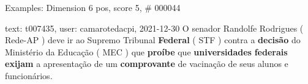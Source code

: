 \begin{frame}{Examples: Dimension 6 pos, score 5, \# 000044}
\footnotesize
\begin{exampleblock}{text: t007435, user: camarotedacpi, 2021-12-30}
 O senador Randolfe Rodrigues ( Rede-AP ) deve ir ao Supremo 
Tribunal \textbf{Federal} ( STF ) contra a \textbf{decisão} do Ministério da 
Educação ( MEC ) que \textbf{proíbe} que \textbf{universidades} 
\textbf{federais} \textbf{exijam} a apresentação de um \textbf{comprovante} de 
vacinação de seus alunos e funcionários. 
\end{exampleblock}
\end{frame}

